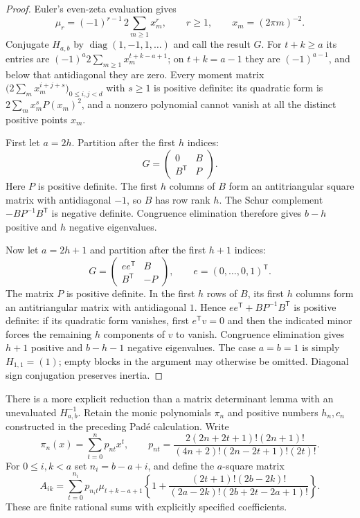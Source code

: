 \begin{proof}
Euler's even-zeta evaluation gives
\[
 \mu_r=(-1)^{r-1}\,2\sum_{m\geq1}x_m^r,
 \qquad r\geq1,\qquad x_m=(2\pi m)^{-2}.
\]
Conjugate $H_{a,b}$ by $\operatorname{diag}(1,-1,1,\ldots)$ and
call the result $G$.  For $t+k\geq a$ its entries are
$(-1)^a2\sum_{m\geq1}x_m^{t+k-a+1}$; on $t+k=a-1$ they are
$(-1)^{a-1}$, and below that antidiagonal they are zero.
Every moment matrix
$\bigl(2\sum_m x_m^{i+j+s}\bigr)_{0\leq i,j<d}$ with $s\geq1$
is positive definite: its quadratic form is
$2\sum_m x_m^s P(x_m)^2$, and a nonzero polynomial cannot vanish
at all the distinct positive points $x_m$.

First let $a=2h$.  Partition after the first $h$ indices:
\[
 G=\begin{pmatrix}0&B\\B^{\mathsf T}&P\end{pmatrix}.
\]
Here $P$ is positive definite.  The first $h$ columns of $B$ form
an antitriangular square matrix with antidiagonal $-1$, so $B$ has
row rank $h$.  The Schur complement
$-BP^{-1}B^{\mathsf T}$ is negative definite.  Congruence elimination
therefore gives $b-h$ positive and $h$ negative eigenvalues.

Now let $a=2h+1$ and partition after the first $h+1$ indices:
\[
 G=\begin{pmatrix}ee^{\mathsf T}&B\\
 B^{\mathsf T}&-P\end{pmatrix},
 \qquad e=(0,\ldots,0,1)^{\mathsf T}.
\]
The matrix $P$ is positive definite.  In the first $h$ rows of $B$,
its first $h$ columns form an antitriangular matrix with
antidiagonal $1$.  Hence
$ee^{\mathsf T}+BP^{-1}B^{\mathsf T}$ is positive definite:
if its quadratic form vanishes, first $e^{\mathsf T}v=0$ and then
the indicated minor forces the remaining $h$ components of $v$ to
vanish.  Congruence elimination gives $h+1$ positive and
$b-h-1$ negative eigenvalues.  The case $a=b=1$ is simply
$H_{1,1}=(1)$; empty blocks in the argument may otherwise be
omitted.  Diagonal sign conjugation preserves inertia.
\end{proof}

There is a more explicit reduction than a matrix determinant lemma
with an unevaluated $H_{a,b}^{-1}$.  Retain the monic polynomials
$\pi_n$ and positive numbers $h_n,c_n$ constructed in the preceding
Pad\'e calculation.  Write
\[
 \pi_n(x)=\sum_{t=0}^n p_{nt}x^t,
 \qquad
 p_{nt}=\frac{2(2n+2t+1)!(2n+1)!}
 {(4n+2)!(2n-2t+1)!(2t)!}.
\]
For $0\leq i,k<a$ set $n_i=b-a+i$, and define the $a$-square matrix
\begin{equation}\label{eq:general-small-A}
 A_{ik}=\sum_{t=0}^{n_i}p_{n_i t}\mu_{t+k-a+1}
 \left\{1+
 \frac{(2t+1)!(2b-2k)!}
 {(2a-2k)!(2b+2t-2a+1)!}\right\}.
\end{equation}
These are finite rational sums with explicitly specified coefficients.

